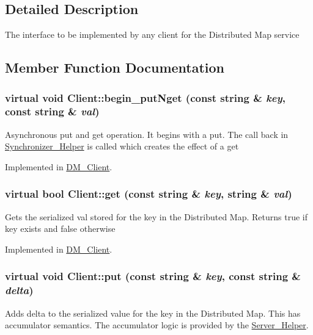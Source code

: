 \subsection{Detailed Description}
The interface to be implemented by any client for the Distributed Map service 

\subsection{Member Function Documentation}
\hypertarget{class_client_a3c7e1cbb61e8a9b2c5c89de884f22253}{
\subsubsection[{begin\_\-putNget}]{\setlength{\rightskip}{0pt plus 5cm}virtual void Client::begin\_\-putNget (const string \& {\em key}, \/  const string \& {\em val})}}
\label{class_client_a3c7e1cbb61e8a9b2c5c89de884f22253}
Asynchronous put and get operation. It begins with a put. The call back in \hyperlink{class_synchronizer___helper}{Synchronizer\_\-Helper} is called which creates the effect of a get 

Implemented in \hyperlink{class_d_m___client_a55c5ec85e4e670a6ec5a4da71e4d50cf}{DM\_\-Client}.

\hypertarget{class_client_aa1e3f5566dadd85d3ac575c7978f65ea}{
\subsubsection[{get}]{\setlength{\rightskip}{0pt plus 5cm}virtual bool Client::get (const string \& {\em key}, \/  string \& {\em val})}}
\label{class_client_aa1e3f5566dadd85d3ac575c7978f65ea}
Gets the serialized val stored for the key in the Distributed Map. Returns true if key exists and false otherwise 

Implemented in \hyperlink{class_d_m___client_aef212e65cee0c1cd11f9480e68f923cd}{DM\_\-Client}.

\hypertarget{class_client_a7369bb878f12a07b717638efb5871668}{
\subsubsection[{put}]{\setlength{\rightskip}{0pt plus 5cm}virtual void Client::put (const string \& {\em key}, \/  const string \& {\em delta})}}
\label{class_client_a7369bb878f12a07b717638efb5871668}
Adds delta to the serialized value for the key in the Distributed Map. This has accumulator semantics. The accumulator logic is provided by the \hyperlink{class_server___helper}{Server\_\-Helper}. 

